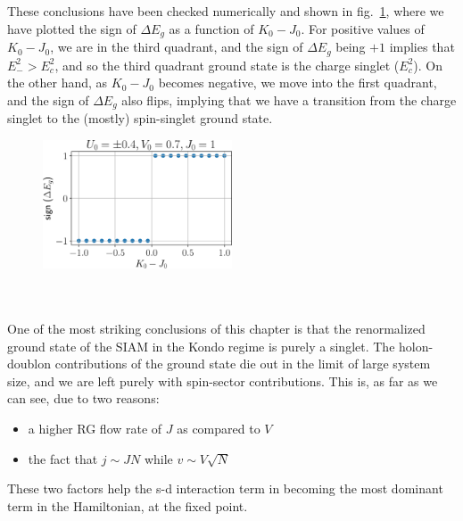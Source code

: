 \documentclass[twoside]{report}
\numberwithin{equation}{section}
\begin{document}
\\\\These conclusions have been checked numerically and shown in fig.~\ref{fig_gstate}, where we have plotted the sign of \(\Delta E_g\) as a function of \(K_0 - J_0\). For positive values of \(K_0 - J_0\), we are in the third quadrant, and the sign of \(\Delta E_g\) being \(+1\) implies that \(E_-^2 > E_c^2\), and so the third quadrant ground state is the charge singlet (\(E_c^2\)). On the other hand, as \(K_0 - J_0\) becomes negative, we move into the first quadrant, and the sign of \(\Delta E_g\) also flips, implying that we have a transition from the charge singlet to the (mostly) spin-singlet ground state.
\begin{figure}[htpb]
	\centering
	\includegraphics[width=0.5\textwidth]{../figures/gstate.pdf}
	\label{fig_gstate}
\end{figure}
\\\\One of the most striking conclusions of this chapter is that the renormalized ground state of the SIAM in the Kondo regime is purely a singlet. The holon-doublon contributions of the ground state die out in the limit of large system size, and we are left purely with spin-sector contributions. This is, as far as we can see, due to two reasons: 
\begin{itemize}
	\item a higher RG flow rate of \(J\) as compared to \(V\)
	\item the fact that \(j \sim J N\) while \(v \sim V\sqrt N \)
\end{itemize}
These two factors help the s-d interaction term in becoming the most dominant term in the Hamiltonian, at the fixed point.
\end{document}
